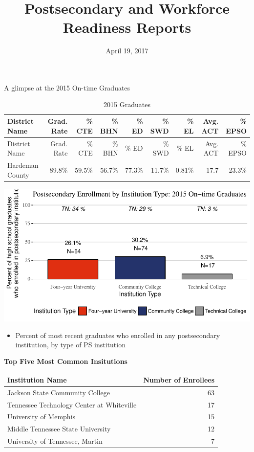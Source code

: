 \documentclass[11pt,]{article}
\title{Postsecondary and Workforce Readiness Reports}
\author{}
\date{April 19, 2017}
\providecommand{\tightlist}{%
  \setlength{\itemsep}{0pt}\setlength{\parskip}{0pt}}
\begin{document}
\maketitle

A glimpse at the 2015 On-time Graduates

\begin{longtable}[]{@{}lrrrrrrrr@{}}
\caption{2015 Graduates}\tabularnewline
\toprule
District Name & Grad. Rate & \% CTE & \% BHN & \% ED & \% SWD & \% EL &
Avg. ACT & \% EPSO\tabularnewline
\midrule
\endfirsthead
\toprule
District Name & Grad. Rate & \% CTE & \% BHN & \% ED & \% SWD & \% EL &
Avg. ACT & \% EPSO\tabularnewline
\midrule
\endhead
Hardeman County & 89.8\% & 59.5\% & 56.7\% & 77.3\% & 11.7\% & 0.81\% &
17.7 & 23.3\%\tabularnewline
\bottomrule
\end{longtable}

\begin{center}\includegraphics{20170419_PSWRR_files/figure-latex/`District by Type P1`-1} \end{center}

\begin{itemize}
\tightlist
\item
  Percent of most recent graduates who enrolled in any postsecondary
  institution, by type of PS institution 
\end{itemize}

\textbf{Top Five Most Common Insitutions}

\begin{longtable}[]{@{}lr@{}}
\toprule
Institution Name & Number of Enrollees\tabularnewline
\midrule
\endhead
Jackson State Community College & 63\tabularnewline
Tennessee Technology Center at Whiteville & 17\tabularnewline
University of Memphis & 15\tabularnewline
Middle Tennessee State University & 12\tabularnewline
University of Tennessee, Martin & 7\tabularnewline
\bottomrule
\end{longtable}
\end{document}
